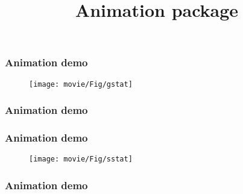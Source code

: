 \selectfont\bf
%
%
\title[]{Animation package}

\begin{frame}
  \frametitle{Animation demo}
  \begin{figure}
  \texttt{[image: movie/Fig/gstat]}
  \end{figure}
\end{frame}

\begin{frame}
  \frametitle{Animation demo}
  \begin{figure}
  \end{figure}
\end{frame}

\begin{frame}
  \frametitle{Animation demo}
  \begin{figure}
  \texttt{[image: movie/Fig/sstat]}
  \end{figure}
\end{frame}

\begin{frame}
  \frametitle{Animation demo}
  \begin{figure}
  \end{figure}
\end{frame}

